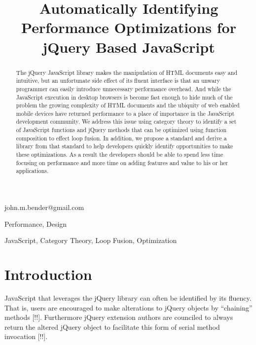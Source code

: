 \documentclass[preprint,10pt]{sigplanconf}
\begin{document}
\copyrightdata{[to be supplied]}


\title{Automatically Identifying Performance Optimizations for jQuery Based JavaScript}

           {}
           {john.m.bender@gmail.com}
\maketitle

\begin{abstract}
The jQuery JavaScript library makes the manipulation of HTML documents easy and intuitive, but an unfortunate side effect of its fluent interface is that an unwary programmer can easily introduce unnecessary performance overhead. And while the JavaScript execution in desktop browsers is become fast enough to hide much of the problem the growing complexity of HTML documents and the ubiquity of web enabled mobile devices have returned performance to a place of importance in the JavaScript development community. We address this issue using category theory to identify a set of JavaScript functions and jQuery methods that can be optimized using function composition to effect loop fusion. In addition, we propose a standard and derive a library from that standard to help developers quickly identify opportunities to make these optimizations. As a result the developers should be able to spend less time focusing on performance and more time on adding features and value to his or her applications.
\end{abstract}


\terms
Performance, Design

\keywords
JavaScript, Category Theory, Loop Fusion, Optimization

\section{Introduction}

JavaScript that leverages the jQuery library can often be identified by its fluency. That is, users are encouraged to make alterations to jQuery objects by ``chaining'' methods [!!]. Furthermore jQuery extension authors are counciled to always return the altered jQuery object to facilitate this form of serial method invocation [!!].
\end{document}
